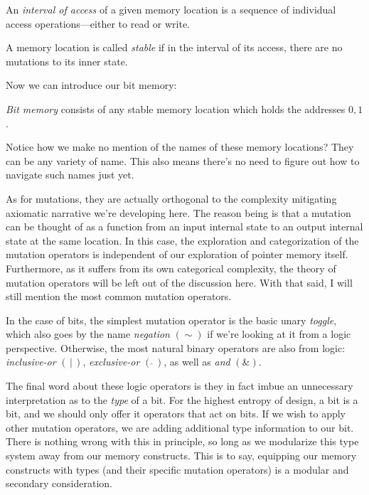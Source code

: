 \documentclass[twoside]{article}
\newenvironment{definition}[1][Definition]{\begin{trivlist}
\item[\hskip \labelsep {\bfseries #1:}]}{\end{trivlist}}
\begin{document}
\begin{definition}[Interval of access]
An \emph{interval of access} of a given memory location is a sequence of individual access operations---either to read or write.
\end{definition}

\begin{definition}[Stable State Memory]
A memory location is called \emph{stable} if in the interval of its access, there are no mutations to its inner state.
\end{definition}

Now we can introduce our bit memory:

\begin{definition}[Bit Memory]
\emph{Bit memory} consists of any stable memory location which holds the addresses $ 0, 1 $.
\end{definition}

Notice how we make no mention of the names of these memory locations? They can be any variety of name.
This also means there's no need to figure out how to navigate such names just yet.

As for mutations, they are actually orthogonal to the complexity mitigating axiomatic narrative we're developing here.
The reason being is that a mutation can be thought of as a function from an input internal state to an output internal
state at the same location. In this case, the exploration and categorization of the mutation operators is independent
of our exploration of pointer memory itself. Furthermore, as it suffers from its own categorical complexity,
the theory of mutation operators will be left out of the discussion here. With that said, I will still mention
the most common mutation operators.

In the case of bits, the simplest mutation operator is the basic unary \emph{toggle}, which also goes by the name
\emph{negation} $ (\sim) $ if we're looking at it from a logic perspective. Otherwise, the most natural binary
operators are also from logic: \emph{inclusive-or} $ (\,|\,) $, \emph{exclusive-or} $ (\,\hat{}\,) $,
as well as \emph{and} $ (\&) $.

The final word about these logic operators is they in fact imbue an unnecessary interpretation as to the \emph{type}
of a bit. For the highest entropy of design, a bit is a bit, and we should only offer it operators that act on bits.
If we wish to apply other mutation operators, we are adding additional type information to our bit. There is nothing
wrong with this in principle, so long as we modularize this type system away from our memory constructs. This is to say,
equipping our memory constructs with types (and their specific mutation operators) is a modular and secondary consideration.
\end{document}
